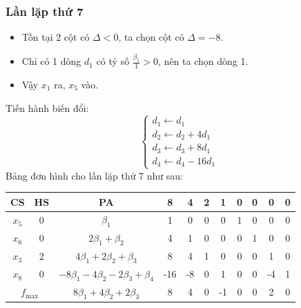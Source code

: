 \documentclass[12pt]{article}
\begin{document}
\subsubsection{Lần lặp thứ 7}
\begin{itemize}
\item Tồn tại 2 cột có $\Delta < 0$, ta chọn cột có $\Delta = -8$.
\item Chỉ có 1 dòng $d_1$ có tỷ số $\displaystyle \frac{\beta_1}{1} > 0$, nên ta chọn dòng 1.
\item Vậy $x_1$ ra, $x_5$ vào.
\end{itemize}
Tiến hành biến đổi:
$$
\left\{
\begin{array}{lll}
d_1 \leftarrow d_1 \\
d_2 \leftarrow d_2 + 4d_1 \\
d_3 \leftarrow d_3 + 8d_1\\
d_4 \leftarrow d_4 - 16d_1
\end{array}
\right.
$$
Bảng đơn hình cho lần lặp thứ 7 như sau:
\begin{table}[H]
\centering
\begin{tabular}{|c|c|c|c|c|c|c|c|c|c|c|}
\hline
CS & HS & PA & 8 & 4 & 2 & 1 & 0 & 0 & 0 & 0 \\
\hline
$x_5$ & 0 & $\beta_1$ & 1 & 0 & 0 & 0 & 1 & 0 & 0 & 0 \\
$x_6$ & 0 & $2\beta_1 + \beta_2$ & 4 & 1 & 0 & 0 & 0 & 1 & 0 & 0 \\
$x_3$ & 2 & $4\beta_1 + 2\beta_2 + \beta_3$ & 8 & 4 & 1 & 0 & 0 & 0 & 1 & 0 \\
$x_8$ & 0 & $-8\beta_1 - 4\beta_2 - 2\beta_3 + \beta_4$ & -16 & -8 & 0 & 1 & 0 & 0 & -4 & 1 \\
\hline
\multicolumn{2}{|c|}{$f_{\max}$}
& $8\beta_1 + 4\beta_2 + 2\beta_3$ & 8 & 4 & 0 & -1 & 0 & 0 & 2 & 0 \\
\hline
\end{tabular}
\end{table}
\end{document}
